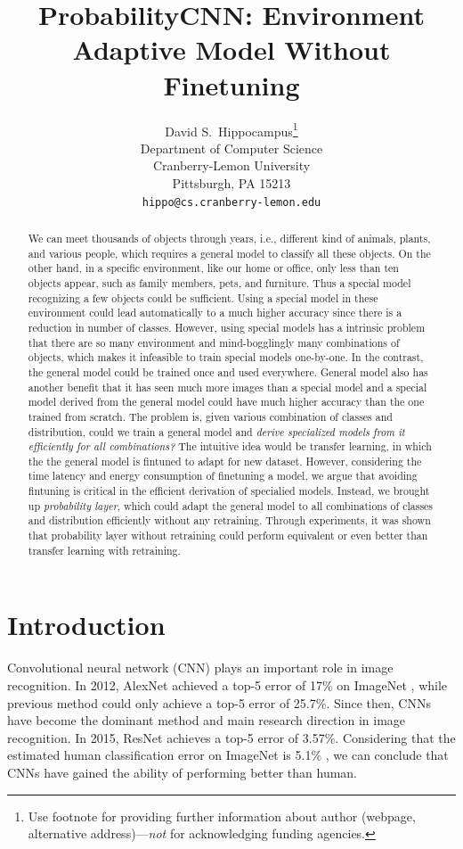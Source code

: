 \documentclass{article}
\title{ProbabilityCNN: Environment Adaptive Model Without Finetuning}
\author{
  David S.~Hippocampus\thanks{Use footnote for providing further
    information about author (webpage, alternative
    address)---\emph{not} for acknowledging funding agencies.} \\
  Department of Computer Science\\
  Cranberry-Lemon University\\
  Pittsburgh, PA 15213 \\
  \texttt{hippo@cs.cranberry-lemon.edu} \\
}
\begin{document}

\maketitle


\begin{abstract}
  We can meet thousands of objects through years, i.e., different kind of animals, plants, and various people, which requires a general model to classify all these objects. On the other hand, in a specific environment, like our home or office, only less than ten objects appear, such as family members, pets, and furniture. Thus a special model recognizing a few objects could be sufficient. Using a special model in these environment could lead automatically to a much higher accuracy since there is a reduction in number of classes. However, using special models has a intrinsic problem that there are so many environment and mind-bogglingly many combinations of objects, which makes it infeasible to train special models one-by-one. In the contrast, the general model could be trained once and used everywhere. General model also has another benefit that it has seen much more images than a special model and a special model derived from the general model could have much higher accuracy than the one trained from scratch. The problem is, given various combination of classes and distribution, could we train a general model and \textit{derive specialized models from it efficiently for all combinations?} The intuitive idea would be transfer learning, in which the the general model is fintuned to adapt for new dataset. However, considering the time latency and energy consumption of finetuning a model, we argue that avoiding fintuning is critical in the efficient derivation of specialied models. Instead, we brought up \textit{probability layer}, which could adapt the general model to all combinations of classes and distribution efficiently without any retraining. Through experiments, it was shown that probability layer without retraining could perform equivalent or even better than transfer learning with retraining.
\end{abstract}


\section{Introduction}
Convolutional neural network (CNN) plays an important role in image recognition. In 2012, AlexNet \cite{krizhevsky2012imagenet} achieved a top-5 error of 17\% on ImageNet \cite{deng2009imagenet}, while previous method could only achieve a top-5 error of 25.7\%. Since then, CNNs have become the dominant method and main research direction in image recognition. In 2015, ResNet \cite{he2016deep} achieves a top-5 error of 3.57\%. Considering that the estimated human classification error on ImageNet is 5.1\% \cite{russakovsky2015imagenet}, we can conclude that CNNs have gained the ability of performing better than human. 
\end{document}
